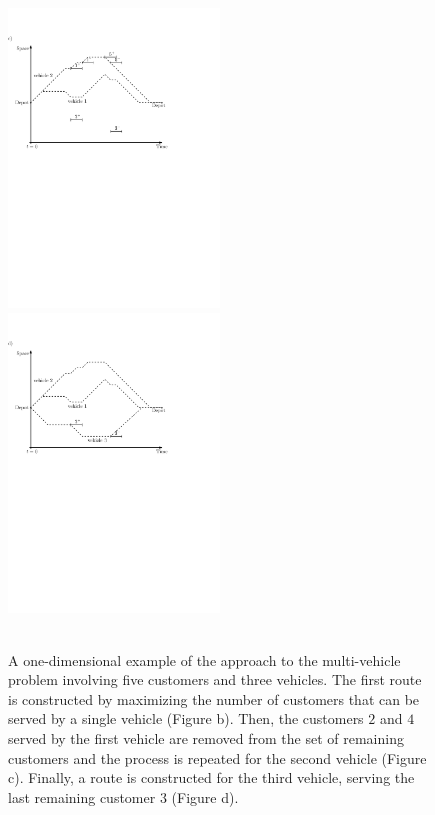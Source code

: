 \documentclass[dissertation,draft*]{aaltoseries}
\begin{document}
\begin{figure}[ht]
\includegraphics[width=0.5\textwidth]{greedy06b.pdf} \   
\includegraphics[width=0.5\textwidth]{greedy07b.pdf}  \\ \ \\   
\caption{A one-dimensional example of the approach to the multi-vehicle problem involving five customers 
and three vehicles. The first route is constructed by maximizing 
the number of customers that can be served by a single vehicle (Figure b). 
Then, the customers $2$ and $4$ served by the first vehicle are removed from the set of remaining customers and the process 
is repeated for the second vehicle (Figure c). Finally, a route is constructed for the third vehicle, serving the
last remaining customer $3$ (Figure d).
}
\label{greedyidea}
\end{figure}
\end{document}
